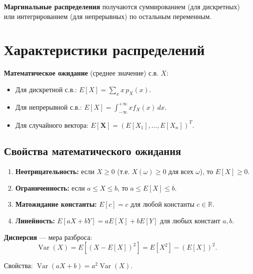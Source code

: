 \documentclass[10pt]{article}
\begin{document}
\textbf{Маргинальные распределения} получаются суммированием (для дискретных) или интегрированием (для непрерывных) по остальным переменным.

\section{Характеристики распределений}

\begin{definition}
\textbf{Математическое ожидание} (среднее значение) с.в. $X$:
\begin{itemize}
    \item Для дискретной с.в.: $E[X] = \sum_x x \, p_X(x)$.
    \item Для непрерывной с.в.: $E[X] = \int_{-\infty}^{+\infty} x f_X(x) \, dx$.
    \item Для случайного вектора: $E[\mathbf{X}] = (E[X_1], \dots, E[X_n])^T$.
\end{itemize}
\end{definition}

\subsection*{Свойства математического ожидания}
\begin{enumerate}
    \item \textbf{Неотрицательность:} если $X \ge 0$ (т.е. $X(\omega) \ge 0$ для всех $\omega$), то $E[X] \ge 0$.
    \item \textbf{Ограниченность:} если $a \le X \le b$, то $a \le E[X] \le b$.
    \item \textbf{Матожидание константы:} $E[c] = c$ для любой константы $c \in \mathbb{R}$.
    \item \textbf{Линейность:} $E[aX + bY] = aE[X] + bE[Y]$ для любых констант $a, b$.
\end{enumerate}

\begin{definition}
\textbf{Дисперсия} — мера разброса: $$\operatorname{Var}(X) = E[(X - E[X])^2] = E[X^2] - (E[X])^2\text{.}$$
\end{definition}
Свойства: $\operatorname{Var}(aX + b) = a^2 \operatorname{Var}(X)$.
\end{document}

